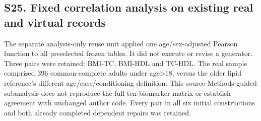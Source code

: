 \documentclass[11pt,letterpaper]{article}
\begin{document}
\clearpage

\subsection*{S25. Fixed correlation analysis on existing real and virtual records}

The separate analysis-only reuse unit applied one age/\allowbreak{}sex-adjusted Pearson function to all preselected frozen tables. It did not execute or revise a generator. Three pairs were retained: BMI-TC, BMI-HDL and TC-HDL. The real sample comprised 396 common-complete adults under age>18, versus the older lipid reference's different age/\allowbreak{}case/\allowbreak{}conditioning definition. This source-Methods-guided subanalysis does not reproduce the full ten-biomarker matrix or establish agreement with unchanged author code. Every pair in all six initial constructions and both already completed dependent repairs was retained.


\FloatBarrier

\begingroup

\small

\renewcommand{\arraystretch}{1.22}
\end{document}
